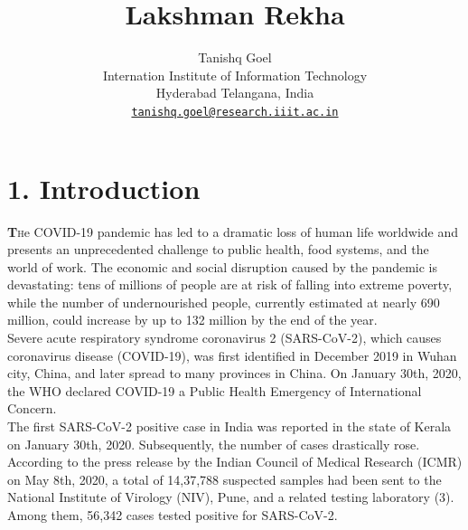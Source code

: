 \documentclass[eng]{FCEFyN-class}
\title{Lakshman Rekha}
\author {Tanishq Goel\\ 
\normalfont Internation Institute of Information Technology\\
\normalfont Hyderabad Telangana, India\\

\href{mailto:tanishq.goel@research.iiit.ac.in}{\nolinkurl{tanishq.goel@research.iiit.ac.in}}\\}
\begin{document}


\maketitle
\thispagestyle{fancy}


\section{1. Introduction}
\lettrine[findent=2pt]{\textbf{T}}{h}e COVID-19 pandemic has led to a dramatic loss of human life worldwide and presents an unprecedented challenge to public health, food systems, and the world of work. The economic and social disruption caused by the pandemic is devastating: tens of millions of people are at risk of falling into extreme poverty, while the number of undernourished people, currently estimated at nearly 690 million, could increase by up to 132 million by the end of the year.\\

Severe acute respiratory syndrome coronavirus 2 (SARS-CoV-2), which causes coronavirus disease (COVID-19), was first identified in December 2019 in Wuhan city, China, and later spread to many provinces in China.  On January 30th, 2020, the WHO declared COVID-19 a Public Health Emergency of International Concern. \\

The first SARS-CoV-2 positive case in India was reported in the state of Kerala on January 30th, 2020. Subsequently, the number of cases drastically rose. According to the press release by the Indian Council of Medical Research (ICMR) on May 8th, 2020, a total of 14,37,788 suspected samples had been sent to the National Institute of Virology (NIV), Pune, and a related testing laboratory (3). Among them, 56,342 cases tested positive for SARS-CoV-2.\\
\end{document}
